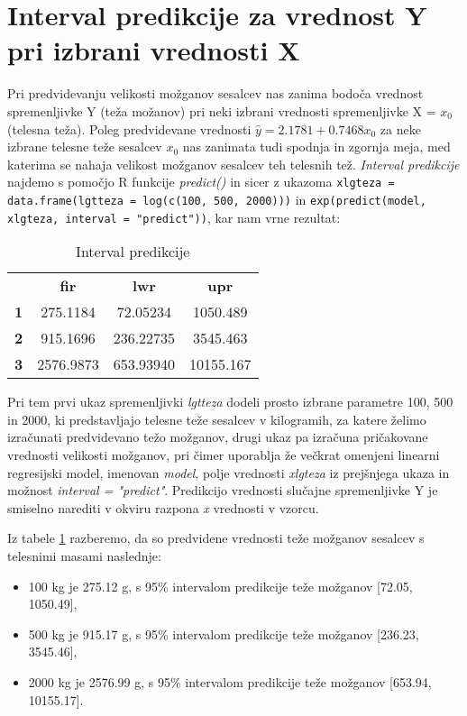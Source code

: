 \section{Interval predikcije za vrednost Y pri izbrani vrednosti X}

Pri predvidevanju velikosti možganov sesalcev nas zanima bodoča vrednost spremenljivke Y (teža možanov)
pri neki izbrani vrednosti spremenljivke X = $x_0$ (telesna teža).
Poleg predvidevane vrednosti $\widehat{y} = 2.1781 + 0.7468x_0$ za neke izbrane telesne teže sesalcev $x_0$ nas
zanimata tudi spodnja in zgornja meja, med katerima se nahaja velikost možganov sesalcev teh telesnih tež.
\emph{Interval predikcije} najdemo s pomočjo R funkcije \emph{predict()} in sicer z ukazoma
\verb|xlgteza = data.frame(lgtteza = log(c(100, 500, 2000)))| in \verb|exp(predict(model, xlgteza, interval = "predict"))|,
kar nam vrne rezultat:

\begin{table}[h]
    \centering
    \begin{tabular}{cccc}
    \textbf{}  & \textbf{fir} & \textbf{lwr} & \textbf{upr} \\
    \textbf{1} & 275.1184     & 72.05234     & 1050.489     \\
    \textbf{2} & 915.1696     & 236.22735    & 3545.463     \\
    \textbf{3} & 2576.9873    & 653.93940    & 10155.167   
    \end{tabular}
    \caption{Interval predikcije}
    \label{tab:interval-predikcije}
    \end{table}

\noindent
Pri tem prvi ukaz spremenljivki \emph{lgtteza} dodeli prosto izbrane parametre 100, 500 in 2000, ki predstavljajo
telesne teže sesalcev v kilogramih, za katere želimo izračunati predvidevano težo možganov, drugi ukaz pa
izračuna pričakovane vrednosti velikosti možganov, pri čimer uporablja že večkrat omenjeni linearni regresijski model,
imenovan \emph{model}, polje vrednosti \emph{xlgteza} iz prejšnjega ukaza in možnost \emph{interval = "predict"}.
Predikcijo vrednosti slučajne spremenljivke Y je smiselno narediti v okviru razpona \emph{x} vrednosti v vzorcu.

Iz tabele \ref{tab:interval-predikcije} razberemo, da so predvidene vrednosti teže možganov sesalcev s telesnimi masami
naslednje:

\begin{itemize}
    \item 100 kg je 275.12 g, s 95\% intervalom predikcije teže možganov [72.05, 1050.49],
    \item 500 kg je 915.17 g, s 95\% intervalom predikcije teže možganov [236.23, 3545.46],
    \item 2000 kg je 2576.99 g, s 95\% intervalom predikcije teže možganov [653.94, 10155.17].
\end{itemize}
